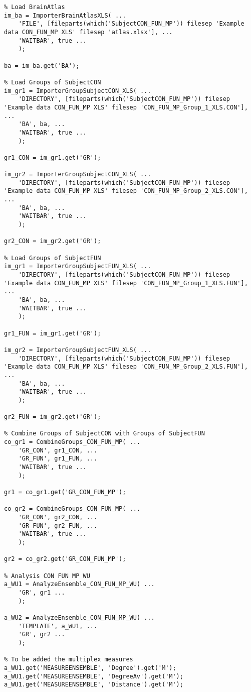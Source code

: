 \documentclass{tufte-handout}
\begin{document}
\begin{lstlisting}
% Load BrainAtlas
im_ba = ImporterBrainAtlasXLS( ...
    'FILE', [fileparts(which('SubjectCON_FUN_MP')) filesep 'Example data CON_FUN_MP XLS' filesep 'atlas.xlsx'], ...
    'WAITBAR', true ...
    );

ba = im_ba.get('BA');

% Load Groups of SubjectCON
im_gr1 = ImporterGroupSubjectCON_XLS( ...
    'DIRECTORY', [fileparts(which('SubjectCON_FUN_MP')) filesep 'Example data CON_FUN_MP XLS' filesep 'CON_FUN_MP_Group_1_XLS.CON'], ...
    'BA', ba, ...
    'WAITBAR', true ...
    );

gr1_CON = im_gr1.get('GR');

im_gr2 = ImporterGroupSubjectCON_XLS( ...
    'DIRECTORY', [fileparts(which('SubjectCON_FUN_MP')) filesep 'Example data CON_FUN_MP XLS' filesep 'CON_FUN_MP_Group_2_XLS.CON'], ...
    'BA', ba, ...
    'WAITBAR', true ...
    );

gr2_CON = im_gr2.get('GR');

% Load Groups of SubjectFUN
im_gr1 = ImporterGroupSubjectFUN_XLS( ...
    'DIRECTORY', [fileparts(which('SubjectCON_FUN_MP')) filesep 'Example data CON_FUN_MP XLS' filesep 'CON_FUN_MP_Group_1_XLS.FUN'], ...
    'BA', ba, ...
    'WAITBAR', true ...
    );

gr1_FUN = im_gr1.get('GR');

im_gr2 = ImporterGroupSubjectFUN_XLS( ...
    'DIRECTORY', [fileparts(which('SubjectCON_FUN_MP')) filesep 'Example data CON_FUN_MP XLS' filesep 'CON_FUN_MP_Group_2_XLS.FUN'], ...
    'BA', ba, ...
    'WAITBAR', true ...
    );

gr2_FUN = im_gr2.get('GR');

% Combine Groups of SubjectCON with Groups of SubjectFUN
co_gr1 = CombineGroups_CON_FUN_MP( ...
    'GR_CON', gr1_CON, ...
    'GR_FUN', gr1_FUN, ...
    'WAITBAR', true ...
    );

gr1 = co_gr1.get('GR_CON_FUN_MP');

co_gr2 = CombineGroups_CON_FUN_MP( ...
    'GR_CON', gr2_CON, ...
    'GR_FUN', gr2_FUN, ...
    'WAITBAR', true ...
    );

gr2 = co_gr2.get('GR_CON_FUN_MP');

% Analysis CON FUN MP WU
a_WU1 = AnalyzeEnsemble_CON_FUN_MP_WU( ...
    'GR', gr1 ...
    );

a_WU2 = AnalyzeEnsemble_CON_FUN_MP_WU( ...
    'TEMPLATE', a_WU1, ...
    'GR', gr2 ...
    );

% To be added the multiplex measures
a_WU1.get('MEASUREENSEMBLE', 'Degree').get('M');
a_WU1.get('MEASUREENSEMBLE', 'DegreeAv').get('M');
a_WU1.get('MEASUREENSEMBLE', 'Distance').get('M');


\end{lstlisting}
\end{document}
